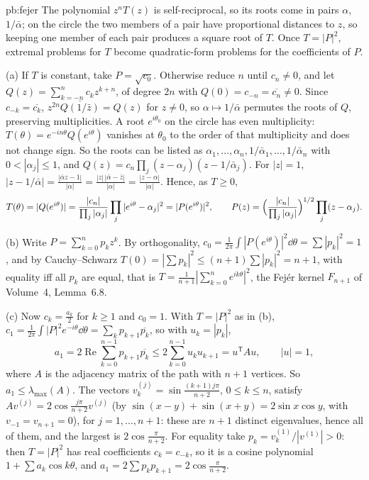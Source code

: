 \begin{solution}{pb:fejer}
\idea The polynomial $z^nT(z)$ is self-reciprocal, so its roots come in pairs $\alpha$, $1/\bar\alpha$; on the circle the two members of a pair
have proportional distances to $z$, so keeping one member of each pair produces a square root of $T$. Once $T=|P|^2$, extremal problems
for $T$ become quadratic-form problems for the coefficients of $P$.

\writeup (a) If $T$ is constant, take $P=\sqrt{c_0}$. Otherwise reduce $n$ until $c_n\ne0$, and let $Q(z)=\sum_{k=-n}^nc_kz^{k+n}$, of degree $2n$ with $Q(0)=c_{-n}=\overline{c_n}\ne0$.
Since $c_{-k}=\overline{c_k}$, $z^{2n}\overline{Q(1/\bar z)}=Q(z)$ for $z\ne0$, so $\alpha\mapsto1/\bar\alpha$ permutes the roots of $Q$, preserving multiplicities. A root
$e^{i\theta_0}$ on the circle has even multiplicity: $T(\theta)=e^{-in\theta}Q(e^{i\theta})$ vanishes at $\theta_0$ to the order of that multiplicity and does not change
sign. So the roots can be listed as $\alpha_1,\dots,\alpha_n,1/\bar\alpha_1,\dots,1/\bar\alpha_n$ with $0<|\alpha_j|\le1$, and $Q(z)=c_n\prod_j(z-\alpha_j)(z-1/\bar\alpha_j)$. For $|z|=1$,
$|z-1/\bar\alpha|=\frac{|\bar\alpha z-1|}{|\alpha|}=\frac{|z|\,|\bar\alpha-\bar z|}{|\alpha|}=\frac{|z-\alpha|}{|\alpha|}$. Hence, as $T\ge0$,
\[
T(\theta)=|Q(e^{i\theta})|=\frac{|c_n|}{\prod_j|\alpha_j|}\prod_j|e^{i\theta}-\alpha_j|^2=|P(e^{i\theta})|^2,\qquad P(z)=\Bigl(\frac{|c_n|}{\prod_j|\alpha_j|}\Bigr)^{1/2}\prod_j(z-\alpha_j).
\]

(b) Write $P=\sum_{k=0}^np_kz^k$. By orthogonality, $c_0=\frac1{2\pi}\int|P(e^{i\theta})|^2\dd\theta=\sum|p_k|^2=1$, and by Cauchy--Schwarz
$T(0)=|\sum p_k|^2\le(n+1)\sum|p_k|^2=n+1$, with equality iff all $p_k$ are equal, that is $T=\frac1{n+1}|\sum_{k=0}^ne^{ik\theta}|^2$, the Fejér kernel $F_{n+1}$ of
Volume~4, Lemma~6.8.

(c) Now $c_k=\frac{a_k}2$ for $k\ge1$ and $c_0=1$. With $T=|P|^2$ as in (b), $c_1=\frac1{2\pi}\int|P|^2e^{-i\theta}\dd\theta=\sum_kp_{k+1}\overline{p_k}$, so with $u_k=|p_k|$,
\[
a_1=2\operatorname{Re}\sum_{k=0}^{n-1}p_{k+1}\overline{p_k}\le2\sum_{k=0}^{n-1}u_ku_{k+1}=u^{\mathsf T}Au,\qquad|u|=1,
\]
where $A$ is the adjacency matrix of the path with $n+1$ vertices. So $a_1\le\lambda_{\max}(A)$. The vectors $v^{(j)}_k=\sin\frac{(k+1)j\pi}{n+2}$, $0\le k\le n$, satisfy
$Av^{(j)}=2\cos\frac{j\pi}{n+2}v^{(j)}$ (by $\sin(x-y)+\sin(x+y)=2\sin x\cos y$, with $v_{-1}=v_{n+1}=0$), for $j=1,\dots,n+1$: these are $n+1$ distinct eigenvalues,
hence all of them, and the largest is $2\cos\frac\pi{n+2}$. For equality take $p_k=v^{(1)}_k/|v^{(1)}|>0$: then $T=|P|^2$ has real coefficients $c_k=c_{-k}$, so it is
a cosine polynomial $1+\sum a_k\cos k\theta$, and $a_1=2\sum p_kp_{k+1}=2\cos\frac\pi{n+2}$.


\end{solution}
